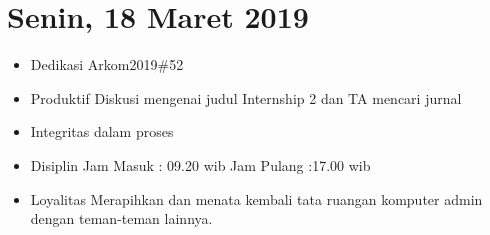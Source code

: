 \section{Senin, 18 Maret 2019}
\begin{itemize}
\item Dedikasi
\subitem Arkom2019\#52
\item Produktif
  \subitem Diskusi mengenai judul Internship 2 dan TA
  \subitem mencari jurnal
\item Integritas
  \subitem dalam proses
\item Disiplin
  \subitem Jam Masuk : 09.20 wib
  \subitem Jam Pulang :17.00 wib
\item Loyalitas
  \subitem Merapihkan dan menata kembali tata ruangan komputer admin dengan teman-teman lainnya.
\end{itemize}